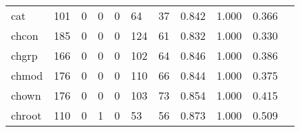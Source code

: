 \begin{longtable}{lp{1.2cm}p{1.2cm}p{1.2cm}p{1.2cm}p{1.2cm}p{1.2cm}p{1.2cm}p{1.2cm}p{1.2cm}p{1.2cm}}
cat       &                                   101 &                                                  0 &                                                  0 &                                                  0 &                                                 64 &                                                 37 &                                         0.842 &                                              1.000 &                                              0.366 \\
chcon     &                                   185 &                                                  0 &                                                  0 &                                                  0 &                                                124 &                                                 61 &                                         0.832 &                                              1.000 &                                              0.330 \\
chgrp     &                                   166 &                                                  0 &                                                  0 &                                                  0 &                                                102 &                                                 64 &                                         0.846 &                                              1.000 &                                              0.386 \\
chmod     &                                   176 &                                                  0 &                                                  0 &                                                  0 &                                                110 &                                                 66 &                                         0.844 &                                              1.000 &                                              0.375 \\
chown     &                                   176 &                                                  0 &                                                  0 &                                                  0 &                                                103 &                                                 73 &                                         0.854 &                                              1.000 &                                              0.415 \\
chroot    &                                   110 &                                                  0 &                                                  1 &                                                  0 &                                                 53 &                                                 56 &                                         0.873 &                                              1.000 &                                              0.509 \\

\end{longtable}
